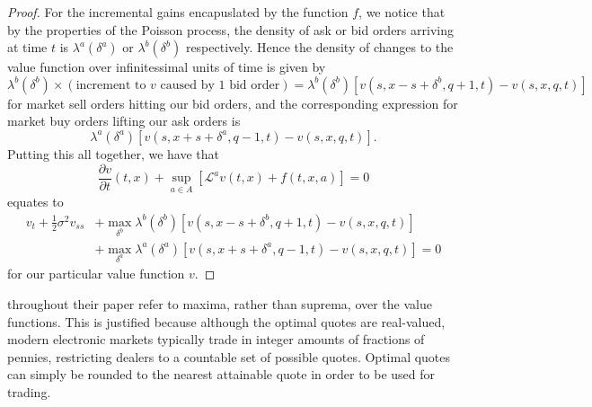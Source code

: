 \begin{proof}
    For the incremental gains encapuslated by the function $f$, we notice that 
    by the properties of the Poisson process, the density of ask or bid orders
    arriving at time $t$ is $\lambda^a(\delta^a)$ or $\lambda^b(\delta^b)$ respectively.
    Hence the density of changes to the value function over infinitessimal units of 
    time is given by 
    \begin{equation*}
        \lambda^b(\delta^b)\times(\textrm{increment to $v$ caused by 1 bid order})=\lambda^b(\delta^b)[v(s,x-s+\delta^b,q+1,t)-v(s,x,q,t)]
    \end{equation*}
    for market sell orders hitting our bid orders, and the corresponding expression 
    for market buy orders lifting our ask orders is 
    \begin{equation*}
        \lambda^a(\delta^a)[v(s,x+s+\delta^a,q-1,t)-v(s,x,q,t)].
    \end{equation*}
    Putting this all together, we have that 
    \begin{equation*}
        \frac{\partial v}{\partial t}(t,x)+\sup_{a\in A}\left[\mathcal{L}^av(t,x)+f(t,x,a)\right]=0
    \end{equation*}
    equates to 
    \begin{equation*}
            \begin{aligned}
                v_t+\frac{1}{2}\sigma^2v_{ss}&+\max\limits_{\delta^b}\lambda^b(\delta^b)[v(s,x-s+\delta^b,q+1,t)-v(s,x,q,t)]\\
                &+\max\limits_{\delta^a}\lambda^a(\delta^a)[v(s,x+s+\delta^a,q-1,t)-v(s,x,q,t)]=0
            \end{aligned}
    \end{equation*}
    for our particular value function $v$. 
\end{proof}

\begin{remark}
    \cite{AS2008} throughout their paper refer to maxima, rather than suprema, over
    the value functions. This is justified because although the optimal quotes 
    are real-valued, modern electronic markets typically trade in integer amounts 
    of fractions of pennies, restricting dealers to a countable set of possible quotes.
    Optimal quotes can simply be rounded to the nearest attainable quote in order to 
    be used for trading.
\end{remark}

